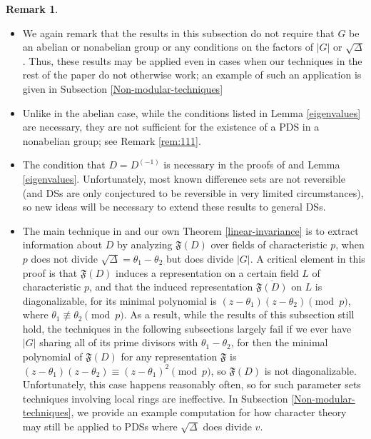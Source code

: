 \documentclass[12pt]{amsproc} %
\theoremstyle{definition}\newtheorem{defn}[thm]{Definition}
\theoremstyle{definition}\newtheorem{rem}[thm]{Remark}
\theoremstyle{definition}\newtheorem{ex}[thm]{Example}
\newcommand{\repF}{\mathfrak{F}}
\begin{document}
		\begin{rem}\label{diagonalization}
		 \begin{itemize}
            \item[(1)] We again remark that the results in this subsection do not require that $G$ be an abelian or nonabelian group or any conditions on the factors of $|G|$ or $\sqrt\Delta$. Thus, these results may be applied even in cases when our techniques in the rest of the paper do not otherwise work; an example of such an application is given in Subsection \ref{Non-modular-techniques}
		  \item[(2)] Unlike in the abelian case, while the conditions listed in Lemma \ref{eigenvalues} are necessary, they are not sufficient for the existence of a PDS in a nonabelian group; see Remark \ref{rem:111}.
		  \item[(3)] The condition that $D = D^{(-1)}$ is necessary in the proofs of \cite[Lemma 2.2]{ott} and Lemma \ref{eigenvalues}. Unfortunately, most known difference sets are not reversible (and DSs are only conjectured to be reversible in very limited circumstances), so new ideas will be necessary to extend these results to general DSs.
		  \item[(4)] The main technique in \cite{ott} and our own Theorem \ref{linear-invariance} is to extract information about $D$ by analyzing $\repF(D)$ over fields of characteristic $p$, when $p$ does not divide $\sqrt{\Delta} = \theta_1 - \theta_2$ but does divide $|G|$. A critical element in this proof is that $\repF(D)$ induces a representation on a certain field $L$ of characteristic $p$, and that the induced representation $\overline{\repF(D)}$ on $L$ is diagonalizable, for its minimal polynomial is $(z - \theta_1)(z-\theta_2) \pmod p$, where $\theta_1 \not \equiv \theta_2 \pmod p$. As a result, while the results of this subsection still hold, the techniques in the following subsections largely fail if we ever have $|G|$ sharing all of its prime divisors with $\theta_1 - \theta_2$, for then the minimal polynomial of $\repF(D)$ for any representation $\repF$ is $(z - \theta_1)(z-\theta_2) \equiv (z-\theta_1)^2 \pmod p$, so $\repF(D)$ is not diagonalizable. Unfortunately, this case happens reasonably often, so for such parameter sets techniques involving local rings are ineffective. In Subsection \ref{Non-modular-techniques}, we provide an example computation for how character theory may still be applied to PDSs where $\sqrt\Delta$ does divide $v$.
		 \end{itemize}

		\end{rem}
\end{document}
